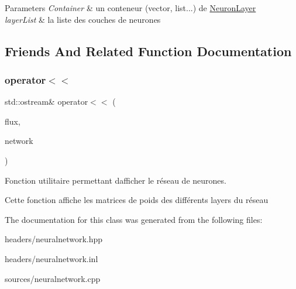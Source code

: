 \begin{DoxyParams}{Parameters}
{\em Container} & un conteneur (vector, list...) de \hyperlink{classNeuronLayer}{Neuron\+Layer} \\
\hline
{\em layer\+List} & la liste des couches de neurones \\
\hline
\end{DoxyParams}


\subsection{Friends And Related Function Documentation}
\mbox{\label{classNeuralNetwork_a0ecebf9a494437efb917804ed271e13f}} 
\subsubsection{\texorpdfstring{operator$<$$<$}{operator<<}}
{\footnotesize\ttfamily std\+::ostream\& operator$<$$<$ (\begin{DoxyParamCaption}\item[{std\+::ostream \&}]{flux,  }\item[{\hyperlink{classNeuralNetwork}{Neural\+Network}}]{network }\end{DoxyParamCaption})\hspace{0.3cm}{\ttfamily [friend]}}



Fonction utilitaire permettant d\textquotesingle{}afficher le réseau de neurones. 

Cette fonction affiche les matrices de poids des différents layers du réseau 

The documentation for this class was generated from the following files\+:\begin{DoxyCompactItemize}
\item 
headers/neuralnetwork.\+hpp\item 
headers/neuralnetwork.\+inl\item 
sources/neuralnetwork.\+cpp\end{DoxyCompactItemize}
